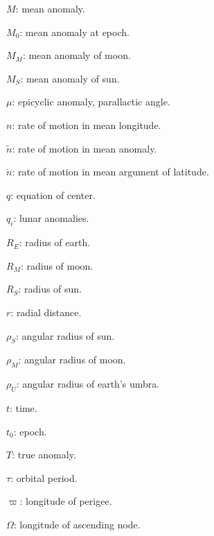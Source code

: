 {\begin{description}
\item $M$: mean anomaly.
\item $M_0$: mean anomaly at epoch.
\item $M_M$: mean anomaly of moon.
\item $M_S$: mean anomaly of sun.
\item $\mu$: epicyclic anomaly, parallactic angle.
\item $n$: rate of motion in mean longitude.
\item $\tilde{n}$: rate of motion in mean anomaly.
\item $\breve{n}$: rate of motion in mean argument of latitude.
\item $q$: equation of center.
\item $q_i$: lunar anomalies.
\item $R_E$: radius of earth.
\item $R_M$: radius of moon.
\item $R_S$: radius of sun.
\item $r$: radial distance.
\item $\rho_S$: angular radius of sun.
\item $\rho_M$: angular radius of moon.
\item $\rho_U$: angular radius of earth's umbra.
\item $t$: time.
\item $t_0$: epoch.
\item $T$: true anomaly.
\item $\tau$: orbital period.
\item$\varpi$: longitude of  perigee.
\item $\Omega$: longitude of ascending node.
\end{description}
\onecolumn
}